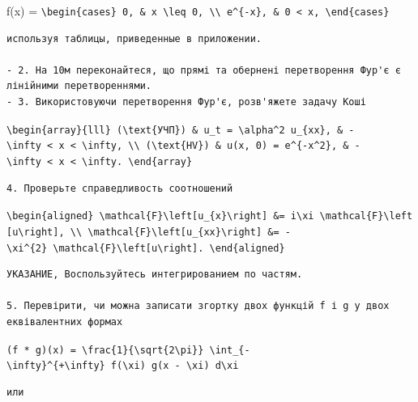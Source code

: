 \documentclass[
  ukrainian,
]{article}
\begin{document}
f(x) =
\texttt{\textbackslash{}begin\{cases\}\ 0,\ \&\ x\ \textbackslash{}leq\ 0,\ \textbackslash{}\textbackslash{}\ e\^{}\{-x\},\ \&\ 0\ \textless{}\ x,\ \textbackslash{}end\{cases\}}

\begin{verbatim}
используя таблицы, приведенные в приложении.

- 2. На 10м переконайтеся, що прямі та обернені перетворення Фур'є є лінійними перетвореннями.
- 3. Використовуючи перетворення Фур'є, розв'яжете задачу Коші
\end{verbatim}

\texttt{\textbackslash{}begin\{array\}\{lll\}\ (\textbackslash{}text\{УЧП\})\ \&\ u\_t\ =\ \textbackslash{}alpha\^{}2\ u\_\{xx\},\ \&\ -\textbackslash{}infty\ \textless{}\ x\ \textless{}\ \textbackslash{}infty,\ \textbackslash{}\textbackslash{}\ (\textbackslash{}text\{HV\})\ \&\ u(x,\ 0)\ =\ e\^{}\{-x\^{}2\},\ \&\ -\textbackslash{}infty\ \textless{}\ x\ \textless{}\ \textbackslash{}infty.\ \textbackslash{}end\{array\}}

\begin{verbatim}
4. Проверьте справедливость соотношений
\end{verbatim}

\texttt{\textbackslash{}begin\{aligned\}\ \textbackslash{}mathcal\{F\}\textbackslash{}left{[}u\_\{x\}\textbackslash{}right{]}\ \&=\ i\textbackslash{}xi\ \textbackslash{}mathcal\{F\}\textbackslash{}left{[}u\textbackslash{}right{]},\ \textbackslash{}\textbackslash{}\ \textbackslash{}mathcal\{F\}\textbackslash{}left{[}u\_\{xx\}\textbackslash{}right{]}\ \&=\ -\textbackslash{}xi\^{}\{2\}\ \textbackslash{}mathcal\{F\}\textbackslash{}left{[}u\textbackslash{}right{]}.\ \textbackslash{}end\{aligned\}}

\begin{verbatim}
УКАЗАНИЕ, Воспользуйтесь интегрированием по частям.

5. Перевірити, чи можна записати згортку двох функцій f і g у двох еквівалентних формах
\end{verbatim}

\texttt{(f\ *\ g)(x)\ =\ \textbackslash{}frac\{1\}\{\textbackslash{}sqrt\{2\textbackslash{}pi\}\}\ \textbackslash{}int\_\{-\textbackslash{}infty\}\^{}\{+\textbackslash{}infty\}\ f(\textbackslash{}xi)\ g(x\ -\ \textbackslash{}xi)\ d\textbackslash{}xi}

\begin{verbatim}
или
\end{verbatim}
\end{document}
